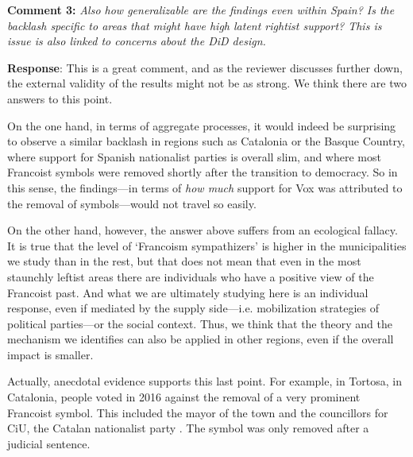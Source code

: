 \documentclass[12pt, a4paper, notitlepage]{article}
\begin{document}
\textbf{Comment 3:} \textit{Also how generalizable are the findings even within Spain? Is the backlash specific to areas that might have high latent rightist support? This is issue is also linked to concerns about the DiD design.}

\textbf{Response}: This is a great comment, and as the reviewer discusses further down, the external validity of the results might not be as strong. We think there are two answers to this point.

On the one hand, in terms of aggregate processes, it would indeed be surprising to observe a similar backlash in regions such as Catalonia or the Basque Country, where support for Spanish nationalist parties is overall slim, and where most Francoist symbols were removed shortly after the transition to democracy. So in this sense, the findings---in terms of \textit{how much} support for Vox was attributed to the removal of symbols---would not travel so easily.

On the other hand, however, the answer above suffers from an ecological fallacy. It is true that the level of `Francoism sympathizers' is higher in the municipalities we study than in the rest, but that does not mean that even in the most staunchly leftist areas there are individuals who have a positive view of the Francoist past.
And what we are ultimately studying here is an individual response, even if mediated by the supply side---i.e. mobilization strategies of political parties---or the social context.
Thus, we think that the theory and the mechanism we identifies can also be applied in other regions, even if the overall impact is smaller.

Actually, anecdotal evidence supports this last point.
For example, in Tortosa, in Catalonia, people voted in 2016 against the removal of a very prominent Francoist symbol.
This included the mayor of the town and the councillors for CiU, the Catalan nationalist party \citep{Berbis2016}. The symbol was only removed after a judicial sentence.
\end{document}
